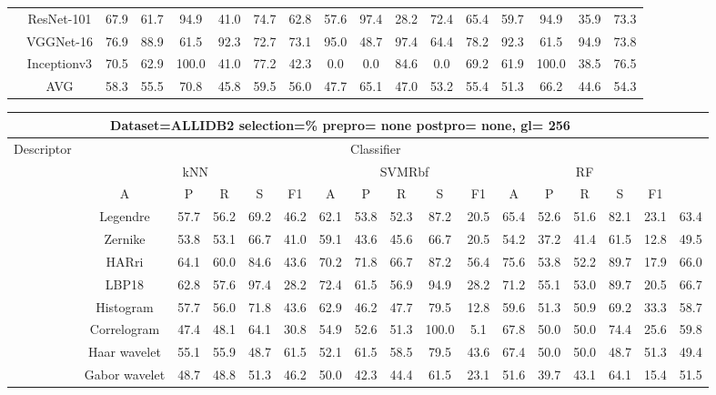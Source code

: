 \documentclass[12pt,italian]{article}
\begin{document}
\begin{tiny}
\begin{longtable}{lcccccccccccccccc}
& ResNet-101 & 67.9 & 61.7 & 94.9 & 41.0 & 74.7 & 62.8 & 57.6 & 97.4 & 28.2 & 72.4 & 65.4 & 59.7 & 94.9 & 35.9 & 73.3 \\ 
& VGGNet-16 & 76.9 & 88.9 & 61.5 & 92.3 & 72.7 & 73.1 & 95.0 & 48.7 & 97.4 & 64.4 & 78.2 & 92.3 & 61.5 & 94.9 & 73.8 \\ 
& Inceptionv3 & 70.5 & 62.9 & 100.0 & 41.0 & 77.2 & 42.3 &  0.0 &  0.0 & 84.6 &  0.0 & 69.2 & 61.9 & 100.0 & 38.5 & 76.5 \\ 
\hline
& AVG & 58.3 & 55.5 & 70.8 & 45.8 & 59.5 & 56.0 & 47.7 & 65.1 & 47.0 & 53.2 & 55.4 & 51.3 & 66.2 & 44.6 & 54.3 \\ 
\hline
\bottomrule
\end{longtable} 

 \pagebreak 
\begin{longtable}{lcccccccccccccccc}
\toprule
\multicolumn{16}{c}{Dataset=ALLIDB2 selection=\% prepro= none postpro= none, gl= 256} \\ 
\toprule
Descriptor & \multicolumn{15}{c}{Classifier} \\ 
& \multicolumn{5}{c}{kNN} & \multicolumn{5}{c}{SVMRbf} & \multicolumn{5}{c}{RF} \\ 
& A & P & R & S & F1 & A & P & R & S & F1 & A & P & R & S & F1 \\ 
\midrule
& Legendre & 57.7 & 56.2 & 69.2 & 46.2 & 62.1 & 53.8 & 52.3 & 87.2 & 20.5 & 65.4 & 52.6 & 51.6 & 82.1 & 23.1 & 63.4 \\ 
& Zernike & 53.8 & 53.1 & 66.7 & 41.0 & 59.1 & 43.6 & 45.6 & 66.7 & 20.5 & 54.2 & 37.2 & 41.4 & 61.5 & 12.8 & 49.5 \\ 
& HARri & 64.1 & 60.0 & 84.6 & 43.6 & 70.2 & 71.8 & 66.7 & 87.2 & 56.4 & 75.6 & 53.8 & 52.2 & 89.7 & 17.9 & 66.0 \\ 
& LBP18 & 62.8 & 57.6 & 97.4 & 28.2 & 72.4 & 61.5 & 56.9 & 94.9 & 28.2 & 71.2 & 55.1 & 53.0 & 89.7 & 20.5 & 66.7 \\ 
& Histogram & 57.7 & 56.0 & 71.8 & 43.6 & 62.9 & 46.2 & 47.7 & 79.5 & 12.8 & 59.6 & 51.3 & 50.9 & 69.2 & 33.3 & 58.7 \\ 
& Correlogram & 47.4 & 48.1 & 64.1 & 30.8 & 54.9 & 52.6 & 51.3 & 100.0 &  5.1 & 67.8 & 50.0 & 50.0 & 74.4 & 25.6 & 59.8 \\ 
& Haar wavelet & 55.1 & 55.9 & 48.7 & 61.5 & 52.1 & 61.5 & 58.5 & 79.5 & 43.6 & 67.4 & 50.0 & 50.0 & 48.7 & 51.3 & 49.4 \\ 
& Gabor wavelet & 48.7 & 48.8 & 51.3 & 46.2 & 50.0 & 42.3 & 44.4 & 61.5 & 23.1 & 51.6 & 39.7 & 43.1 & 64.1 & 15.4 & 51.5 \\ 

\end{longtable}
\end{tiny}
\end{document}
